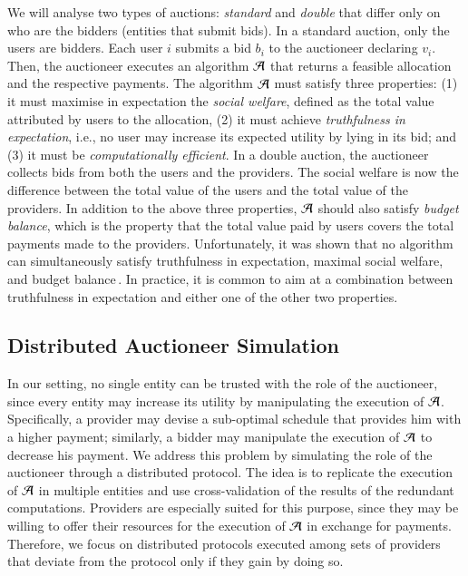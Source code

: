We will analyse two types of auctions: \emph{standard} and \emph{double}
that differ only on who are the bidders (entities that submit bids).
In a standard auction, only the users are bidders.
Each user $i$ submits a bid $b_i$ to the auctioneer declaring $v_i$.
Then, the auctioneer executes an algorithm $\mathcal{A}$ that
returns a feasible allocation and the respective payments.
The algorithm $\mathcal{A}$ must satisfy three properties: (1) it must maximise in expectation 
the \emph{social welfare}, defined as the total value attributed by users to the allocation,
(2) it must achieve \emph{truthfulness in expectation}, i.e.,
no user may increase its expected utility by lying in its bid;
and (3) it must be \emph{computationally efficient}.
In a double auction, the auctioneer collects bids from both the users and the providers.
The social welfare is now the
difference between the total value of the users and the total 
value of the providers. In addition to the above three
properties, $\mathcal{A}$ should also satisfy
\emph{budget balance}, which is the property that the total
value paid by users covers the total payments made to the providers.
Unfortunately, it was shown that no algorithm can simultaneously satisfy
truthfulness in expectation, maximal social welfare, and budget balance\,\cite{Myerson:83}.
In practice, it is common to aim at a combination between
truthfulness in expectation and either one of the other two properties.

\subsection{Distributed Auctioneer Simulation}
In our setting, no single entity can be trusted with the role of the auctioneer,
since every entity may increase its utility by manipulating the execution of $\mathcal{A}$.
Specifically, a provider may devise a sub-optimal schedule
that provides him with a higher payment; similarly, a bidder
may manipulate the execution of $\mathcal{A}$ to decrease his payment.
We address this problem by simulating the role of the auctioneer through a distributed protocol.
The idea is to replicate the execution of $\mathcal{A}$ in multiple entities
and use cross-validation of the results of the redundant computations.
Providers are especially suited for this purpose, since they may be willing
to offer their resources for the execution of $\mathcal{A}$ in exchange for payments.
Therefore, we focus on distributed protocols executed among sets
of providers that deviate from the protocol only if they gain by doing so.

